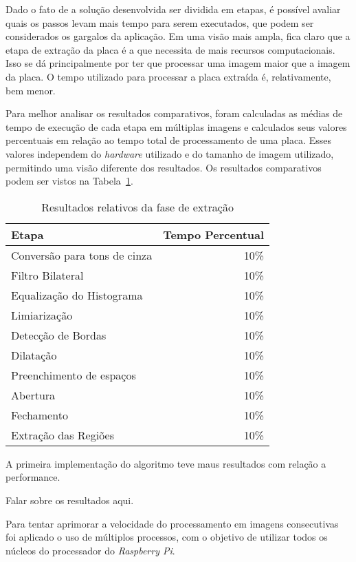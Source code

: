Dado o fato de a solução desenvolvida ser dividida em etapas, é possível avaliar quais os passos levam mais tempo para serem executados, que podem ser considerados os gargalos da aplicação. Em uma visão mais ampla, fica claro que a etapa de extração da placa é a que necessita de mais recursos computacionais. Isso se dá principalmente por ter que processar uma imagem maior que a imagem da placa. O tempo utilizado para processar a placa extraída é, relativamente, bem menor.

Para melhor analisar os resultados comparativos, foram calculadas as médias de tempo de execução de cada etapa em múltiplas imagens e calculados seus valores percentuais em relação ao tempo total de processamento de uma placa. Esses valores independem do \emph{hardware} utilizado e do tamanho de imagem utilizado, permitindo uma visão diferente dos resultados. Os resultados comparativos podem ser vistos na Tabela~\ref{tab:resultados_relativos}.

\begin{table}[H]
\centering
\caption{Resultados relativos da fase de extração}
\label{tab:resultados_relativos}
\begin{tabular}{@{}lr@{}}
\toprule
Etapa                        & Tempo Percentual \\ \midrule
Conversão para tons de cinza & 10\%             \\
Filtro Bilateral             & 10\%             \\
Equalização do Histograma    & 10\%             \\
Limiarização                 & 10\%             \\
Detecção de Bordas           & 10\%             \\
Dilatação                    & 10\%             \\
Preenchimento de espaços     & 10\%             \\
Abertura                     & 10\%             \\
Fechamento                   & 10\%             \\
Extração das Regiões         & 10\%             \\ \bottomrule
\end{tabular}
\end{table}

A primeira implementação do algoritmo teve maus resultados com relação a performance. 

Falar sobre os resultados aqui. 

Para tentar aprimorar a velocidade do processamento em imagens consecutivas foi aplicado o uso de múltiplos processos, com o objetivo de utilizar todos os núcleos do processador do \emph{Raspberry Pi}.

